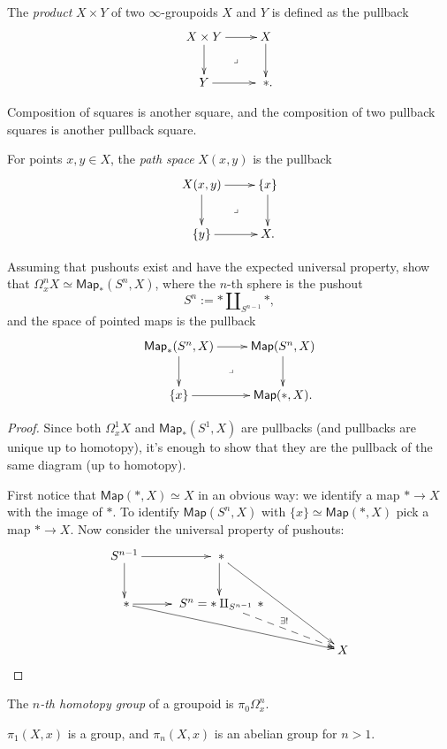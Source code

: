 The {\it product} $X\times Y$ of two $\infty$-groupoids
$X$ and  $Y$ is defined as the pullback
$$
\xymatrix{
X\times Y\ar[r]\ar[d]\ar@{}[dr]|-{\lrcorner}&X\ar[d]\\
Y\ar[r]& \ *.
}
$$

\medskip\noindent
Composition of squares is another square,
and the composition of two pullback squares
is another pullback square.

\begin{definition}
\label{definition-path-space}
For points $x,y \in X$, the {\it path space} $X(x,y)$ 
is the pullback
$$
\xymatrix{
X(x,y)\ar[r]\ar[d]\ar@{}[dr]|-{\lrcorner}&\{x\}\ar[d]\\
\{y\}\ar[r]&X.
}
$$
\end{definition}

\begin{exercise}[2.1.1]
\label{exercise-2.1.1}
Assuming that pushouts exist and have the expected
universal property,
show that $\Omega^n_xX \simeq \mathsf{Map}_*(S^n,X)$,
where the $n$-th sphere is the pushout
$$
S^n:=* \amalg_{S^{n-1}}*,
$$
and the space of pointed maps is the pullback
$$
\xymatrix{
\mathsf{Map}_*(S^n,X)\ar[r]\ar[d]\ar@{}[dr]|-{\lrcorner}
&\mathsf{Map}(S^n,X)\ar[d]\\
\{x\}\ar[r]&\mathsf{Map}(*,X).
}
$$
\end{exercise}

\begin{proof}
Since both
$\Omega^1_xX$ and $\mathsf{Map}_*(S^1,X)$
are pullbacks (and pullbacks
are unique up to homotopy),
it's enough to show that they are
the pullback of the same diagram
(up to homotopy).

First notice that $\mathsf{Map}(*,X)\simeq X$ 
in an obvious way:
we identify a map $* \to X$ 
with the image of $*$.
To identify $\mathsf{Map}(S^n,X)$ 
with $\{x\} \simeq \mathsf{Map}(*,X)$
pick a map $* \to X$.
Now consider the universal 
property of pushouts:
$$
\xymatrix{
S^{n-1} \ar[r] \ar[d] & \ * \ar[d] \ar[rrdd] & & \\
\ * \ar[r] \ar[rrrd] & \ S^n=* \amalg_{S^{n-1}} \, * \ar@{-->}[rrd]^{\exists !}& & \\
& & & X
}
$$
\end{proof}

\begin{definition}
\label{definition-homotopy-groups}
The {\it $n$-th homotopy group} of a groupoid is
$\pi_0\Omega^n_x$.
\end{definition}

\noindent
$\pi_1(X,x)$ is a group, and $\pi_n(X,x)$ is
an abelian group for $n>1$.

